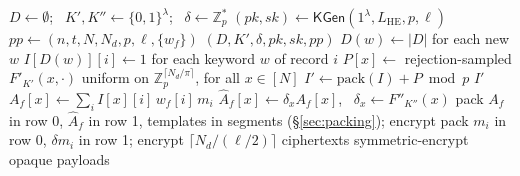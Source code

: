 \documentclass[a4paper,fleqn]{cas-sc}
\begin{document}
\begin{algorithm}[t]
\footnotesize
\caption{Outsourcing at the data owner.}
\label{alg:outsource}
\begin{algorithmic}[1]
  \State $D\gets\emptyset$; \ $K',K''\gets\{0,1\}^\lambda$; \
         $\delta\gets\mathbb{Z}_p^{*}$
  \State $(pk,sk)\gets\mathsf{KGen}(1^\lambda,L_{\mathrm{HE}},p,\ell)$
  \State $pp\gets(n,t,N,N_d,p,\ell,\{w_f\})$
  \State \Return $(D,K',\delta,pk,sk,pp)$
\EndProcedure
\Statex
{}
  \State $D(w)\gets|D|$ for each new $w$
  \State $I[D(w)][i]\gets 1$ for each keyword $w$ of record $i$
  \State $P[x]\gets$ rejection-sampled $F'_{K'}(x,\cdot)$
  \Statex \hfill uniform on $\mathbb{Z}_p^{\lceil N_d/\pi\rceil}$, for all $x\in[N]$
  \State $I'\gets \mathrm{pack}(I)+P \bmod p$
  \State \Return $I'$ 
\EndProcedure
\Statex
{}
    \State $A_f[x]\gets\sum_i I[x][i]\,w_f[i]\,m_i$
    \State $\widehat{A}_f[x]\gets\delta_x A_f[x]$,
           \ $\delta_x\gets F''_{K''}(x)$
    \State pack $A_f$ in row 0, $\widehat{A}_f$ in row 1,
    \Statex \hfill templates in segments (\S\ref{sec:packing}); encrypt
  \EndFor
\EndProcedure
\Statex
{}
  \State pack $m_i$ in row 0, $\delta m_i$ in row 1; encrypt
  \Statex \hfill $\lceil N_d/(\ell/2)\rceil$ ciphertexts
  \State symmetric-encrypt opaque payloads
\EndProcedure
\end{algorithmic}
\end{algorithm}
\end{document}

